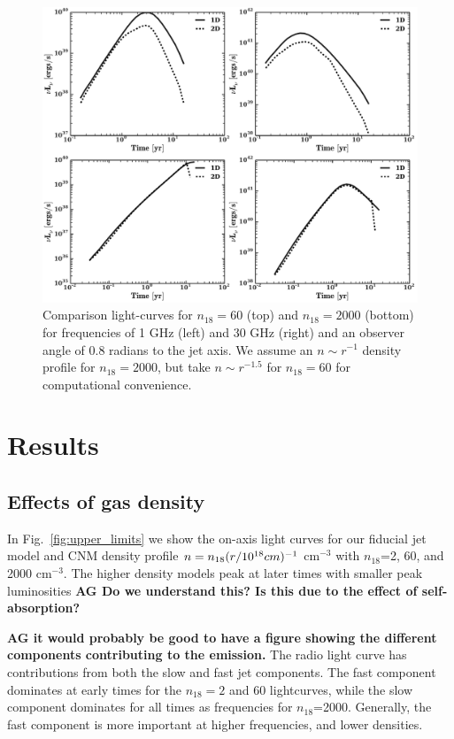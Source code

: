 \documentclass[usenatbib,fleqn]{mnras}
\begin{document}
\begin{figure}
\includegraphics[width=16cm]{1d_2d.pdf}
\caption{\label{fig:1d2dB} Comparison light-curves for $n_{18}=60$
  (top) and $n_{18}=2000$ (bottom) for frequencies of 1 GHz (left) and
  30 GHz (right) and an observer angle of 0.8 radians to the jet
  axis. We assume an $n\sim r^{-1}$ density profile for $n_{18}=2000$,
  but take $n\sim r^{-1.5}$ for $n_{18}=60$ for computational
  convenience.}
\end{figure}


\section{Results}
\label{sec:results}

\subsection{Effects of gas density}

In Fig.~\ref{fig:upper_limits} we show the on-axis light curves for
our fiducial jet model and CNM density profile $n=n_{18} (r/10^{18}
{\rm} cm)^{-1}$ cm$^{-3}$ with $n_{18}$=2, 60, and 2000 cm$^{-3}$. The
higher density models peak at later times with smaller peak
luminosities {\bf AG Do we understand this? Is this due to the effect
  of self-absorption?}

{\bf AG it would probably be good to have a figure showing the
  different components contributing to the emission.} The radio light
curve has contributions from both the slow and fast jet
components. The fast component dominates at
early times for the $n_{18}=2$ and 60 lightcurves, while the slow
component dominates for all times as frequencies for
$n_{18}$=2000. Generally, the fast component is more important at
higher frequencies, and lower densities.
\end{document}
